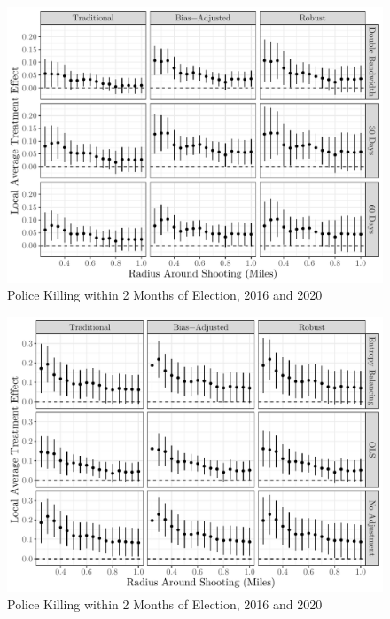 \documentclass[
  12pt,
]{article}
\begin{document}
\begin{figure}[h]

{\centering \includegraphics{shoot_to_files/figure-latex/bws-1} 

}

\caption{\label{fig:map}Police Killing within 2 Months of Election, 2016 and 2020}\label{fig:bws}
\end{figure}

\begin{figure}[h]

{\centering \includegraphics{shoot_to_files/figure-latex/alt-proc-1} 

}

\caption{\label{fig:map}Police Killing within 2 Months of Election, 2016 and 2020}\label{fig:alt-proc}
\end{figure}
\end{document}
